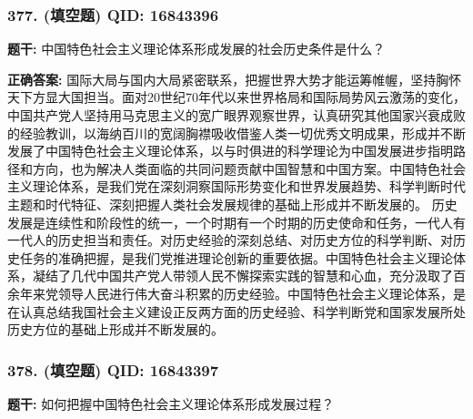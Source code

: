 \documentclass[12pt,UTF8]{ctexart}
\begin{document}
\vspace{0.3em}\hrulefill\vspace{0.7em}

\subsubsection*{377. (填空题) \small QID: 16843396}

\textbf{题干:}
中国特色社会主义理论体系形成发展的社会历史条件是什么？

\textbf{正确答案:}
国际大局与国内大局紧密联系，把握世界大势才能运筹帷幄，坚持胸怀天下方显大国担当。面对20世纪70年代以来世界格局和国际局势风云激荡的变化，中国共产党人坚持用马克思主义的宽广眼界观察世界，认真研究其他国家兴衰成败的经验教训，以海纳百川的宽阔胸襟吸收借鉴人类一切优秀文明成果，形成并不断发展了中国特色社会主义理论体系，以与时俱进的科学理论为中国发展进步指明路径和方向，也为解决人类面临的共同问题贡献中国智慧和中国方案。中国特色社会主义理论体系，是我们党在深刻洞察国际形势变化和世界发展趋势、科学判断时代主题和时代特征、深刻把握人类社会发展规律的基础上形成并不断发展的。
历史发展是连续性和阶段性的统一，一个时期有一个时期的历史使命和任务，一代人有一代人的历史担当和责任。对历史经验的深刻总结、对历史方位的科学判断、对历史任务的准确把握，是我们党推进理论创新的重要依据。中国特色社会主义理论体系，凝结了几代中国共产党人带领人民不懈探索实践的智慧和心血，充分汲取了百余年来党领导人民进行伟大奋斗积累的历史经验。中国特色社会主义理论体系，是在认真总结我国社会主义建设正反两方面的历史经验、科学判断党和国家发展所处历史方位的基础上形成并不断发展的。

\vspace{0.3em}\hrulefill\vspace{0.7em}

\subsubsection*{378. (填空题) \small QID: 16843397}

\textbf{题干:}
如何把握中国特色社会主义理论体系形成发展过程？
\end{document}
